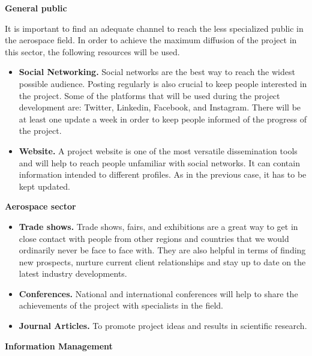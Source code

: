 \textbf{General public}

It is important to find an adequate channel to reach the less specialized public in the aerospace field. In order to achieve the maximum diffusion of the project in this sector,  the following resources will be used.

\begin{itemize}
	\item{\textbf{Social Networking.} Social networks are the best way to reach the widest possible audience. Posting regularly is also crucial to keep people interested in the project. Some of the platforms that will be used during the project development are: Twitter, Linkedin, Facebook, and Instagram. There will be at least one update a week in order to keep people informed of the progress of the project.}
	\item{\textbf{Website.} A project website is one of the most versatile dissemination tools and will help to reach people unfamiliar with social networks. It can contain information intended to different profiles. As in the previous case, it has to be kept updated.}
\end{itemize}

\textbf{Aerospace sector}

\begin{itemize}
	\item{\textbf{Trade shows.} Trade shows, fairs, and exhibitions are a great way to get in close contact with people from other regions and countries that we would ordinarily never be face to face with. They are also helpful in terms of finding new prospects, nurture current client relationships and stay up to date on the latest industry developments.}
	\item{\textbf{Conferences.} National and international conferences will help to share the achievements of the project with specialists in the field.}
	\item {\textbf{Journal Articles.} To promote project ideas and results in scientific research.}
\end{itemize}

\textbf{Information Management}

